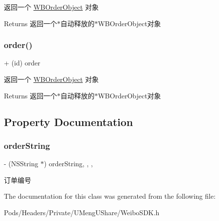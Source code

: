 返回一个 \mbox{\hyperlink{interface_w_b_order_object}{W\+B\+Order\+Object}} 对象

\begin{DoxyReturn}{Returns}
返回一个$\ast$自动释放的$\ast$\+W\+B\+Order\+Object对象 
\end{DoxyReturn}
\mbox{\label{interface_w_b_order_object_a6a258f7fa5542702bfd47a7ae5da1078}} 
\subsubsection{\texorpdfstring{order()}{order()}\hspace{0.1cm}{\footnotesize\ttfamily [3/3]}}
{\footnotesize\ttfamily + (id) order \begin{DoxyParamCaption}{ }\end{DoxyParamCaption}}

返回一个 \mbox{\hyperlink{interface_w_b_order_object}{W\+B\+Order\+Object}} 对象

\begin{DoxyReturn}{Returns}
返回一个$\ast$自动释放的$\ast$\+W\+B\+Order\+Object对象 
\end{DoxyReturn}


\subsection{Property Documentation}
\mbox{\label{interface_w_b_order_object_a6ad6af90d66f95f1265c1f1f614fa5c9}} 
\subsubsection{\texorpdfstring{order\+String}{orderString}}
{\footnotesize\ttfamily -\/ (N\+S\+String $\ast$) order\+String\hspace{0.3cm}{\ttfamily [read]}, {\ttfamily [write]}, {\ttfamily [nonatomic]}, {\ttfamily [strong]}}

订单编号 

The documentation for this class was generated from the following file\+:\begin{DoxyCompactItemize}
\item 
Pods/\+Headers/\+Private/\+U\+Meng\+U\+Share/Weibo\+S\+D\+K.\+h\end{DoxyCompactItemize}
